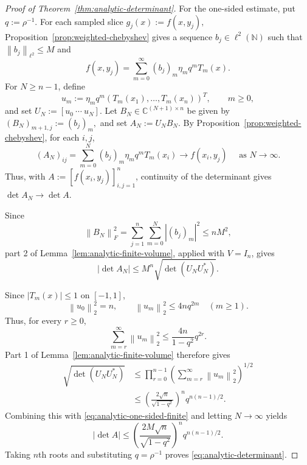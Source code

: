 \documentclass[10pt,a4paper]{amsart}
\newcommand{\C}{\mathbb{C}}
\newcommand{\abs}[1]{\left\lvert #1\right\rvert}
\newcommand{\norm}[1]{\left\lVert #1\right\rVert}
\begin{document}
\begin{proof}[Proof of Theorem~\ref{thm:analytic-determinant}]
For the one-sided estimate, put $
    q:=\rho^{-1}.
$ For each sampled slice $
    g_j(x):=f(x,y_j),
$ 
Proposition~\ref{prop:weighted-chebyshev} gives a sequence
\(b_j\in\ell^2(\mathbb N)\) such that
$
    \norm{b_j}_{\ell^2}\le M
$
and
\[
    f(x,y_j)
    =
    \sum_{m=0}^\infty
    (b_j)_m\eta_mq^mT_m(x).
\]
For \(N\ge n-1\), define
\[
    u_m
    :=
    \eta_mq^m
    (T_m(x_1),\ldots,T_m(x_n))^T,
    \qquad
    m\ge0,
\]
and set
$
    U_N:=[u_0\ \cdots\ u_N].
$
Let \(B_N\in\C^{(N+1)\times n}\) be given by
$
    (B_N)_{m+1,j}:=(b_j)_m,
$
and set
$
    A_N:=U_NB_N.
$
By Proposition~\ref{prop:weighted-chebyshev}, for each \(i,j\),
\[
   (A_N)_{ij}
    =
    \sum_{m=0}^N
    (b_j)_m\eta_mq^mT_m(x_i)
    \longrightarrow
    f(x_i,y_j) \quad
     \text{ as } N\to\infty.
\]
Thus, with $A:=[f(x_i,y_j)]_{i,j=1}^n$, continuity of the determinant
gives $\det A_N\to\det A$.

Since
\[
    \norm{B_N}_F^2
    =
    \sum_{j=1}^n\sum_{m=0}^N\abs{(b_j)_m}^2
    \le
    nM^2,
\]
part 2 of Lemma~\ref{lem:analytic-finite-volume}, applied with
\(V=I_n\), gives
\begin{equation}
    \abs{\det A_N}
    \le
    M^n\sqrt{\det(U_NU_N^*)}.
    \label{eq:analytic-one-sided-finite}
\end{equation}

Since \(\abs{T_m(x)}\le1\) on \([-1, 1]\),
\[
    \norm{u_0}_2^2=n,
    \qquad
    \norm{u_m}_2^2\le4nq^{2m}
    \quad(m\ge1).
\]
Thus, for every \(r\ge0\),
\[
    \sum_{m=r}^\infty\norm{u_m}_2^2
    \le
    \frac{4n}{1-q^2}q^{2r}.
\]
Part 1 of Lemma~\ref{lem:analytic-finite-volume} therefore gives
\begin{equation}
\begin{aligned}
    \sqrt{\det(U_NU_N^*)}
    &\le
    \prod_{r=0}^{n-1}
    \left(
      \sum_{m=r}^\infty\norm{u_m}_2^2
    \right)^{1/2}\\
    &\le
    \left(
      \frac{2\sqrt n}{\sqrt{1-q^2}}
    \right)^n
    q^{n(n-1)/2}.
\end{aligned}
\label{eq:analytic-one-sided-volume}
\end{equation}
Combining this with \eqref{eq:analytic-one-sided-finite} and letting
\(N\to\infty\) yields
\[
    \abs{\det A}
    \le
    \left(
      \frac{2M\sqrt n}{\sqrt{1-q^2}}
    \right)^n
    q^{n(n-1)/2}.
\]
Taking \(n\)th roots and substituting \(q=\rho^{-1}\) proves
\eqref{eq:analytic-determinant}.


\end{proof}
\end{document}
